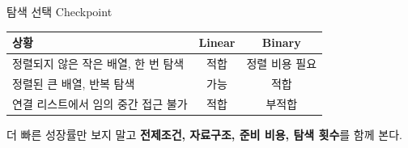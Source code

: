 \begin{frame}{탐색 선택 Checkpoint}
  \begin{tabular}{@{}p{}cc@{}}
    \toprule
    상황 & Linear & Binary \\
    \midrule
    정렬되지 않은 작은 배열, 한 번 탐색 & \alert{적합} & 정렬 비용 필요 \\
    정렬된 큰 배열, 반복 탐색 & 가능 & \alert{적합} \\
    연결 리스트에서 임의 중간 접근 불가 & \alert{적합} & 부적합 \\
    \bottomrule
  \end{tabular}
  \vfill
  \begin{takeaway}
    더 빠른 성장률만 보지 말고 \textbf{전제조건, 자료구조, 준비 비용, 탐색 횟수}를 함께 본다.
  \end{takeaway}
\end{frame}
